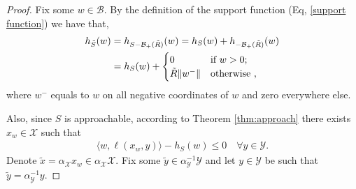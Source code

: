 \documentclass[a4paper,12pt]{article}
\newcommand{\mY}{\mathcal{Y}}
\newcommand{\mX}{\mathcal{X}}
\newcommand{\tY}{\tilde{\mathcal{Y}}}
\newcommand{\tS}{\tilde{S}}
\newcommand{\mB}{\mathcal{B}}
\begin{document}
\begin{proof}

Fix some $w\in\mB$. By the definition of the support function (Eq, \ref{support function}) we have that, 
\begin{align}\label{eq:alphaY:1}
h_{\tS}(w)&= h_{S-\mathcal{B}_+(\tilde{R})}(w)= h_{S}(w)+h_{-\mathcal{B}_+(\tilde{R})}(w) \notag \\ 
&= h_{S}(w)+\begin{cases}
    0 & \text{if } w >0; \\
   \tilde{R}\|w^-\| & \text{otherwise },
\end{cases}
\end{align}
where $w^-$ equals to $w$ on all negative coordinates of $w$ and zero everywhere else. 

Also, since $S$ is approachable, according to Theorem \ref{thm:approach} there exists $x_w \in \mathcal{X}$ such that
\begin{align}\label{eq:alphaY:1}
\langle w, \ell (x_w, y) \rangle - h_S(w) \leq 0 \quad \forall y \in \mathcal{Y}.
\end{align}
Denote $\tilde{x} = \alpha_{\mX} x_w \in \alpha_{\mX}  \mX$. Fix some $\tilde{y}\in\alpha_{\mY}^{-1}\mY$ and let $y\in\mY$ be such that $\tilde{y} = \alpha_{\mY}^{-1}y$.


\end{proof}
\end{document}
